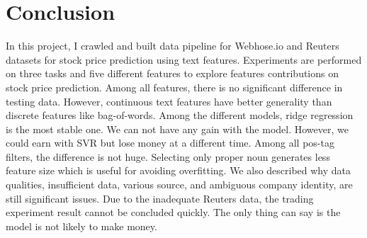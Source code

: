 \documentclass[sigconf]{acmart}
\begin{document}
\section{Conclusion}
In this project, I crawled and built data pipeline for Webhose.io and Reuters datasets for stock price prediction using text features. Experiments are performed on three tasks and five different features to explore features
contributions on stock price prediction. Among all features, there is no significant difference in testing data. However, continuous text features have better generality than discrete features like bag-of-words. Among the different models,
ridge regression is the most stable one. We can not have any gain with the model. However, we could earn with SVR but lose money at a different time. Among all pos-tag filters, the difference is not huge. Selecting only
proper noun generates less feature size which is useful for avoiding overfitting. We also described why data qualities, insufficient data, various source, and ambiguous company identity, are still significant issues. Due to the inadequate
Reuters data, the trading experiment result cannot be concluded quickly. The only thing can say is the model is not likely to make money.



 
\end{document}
